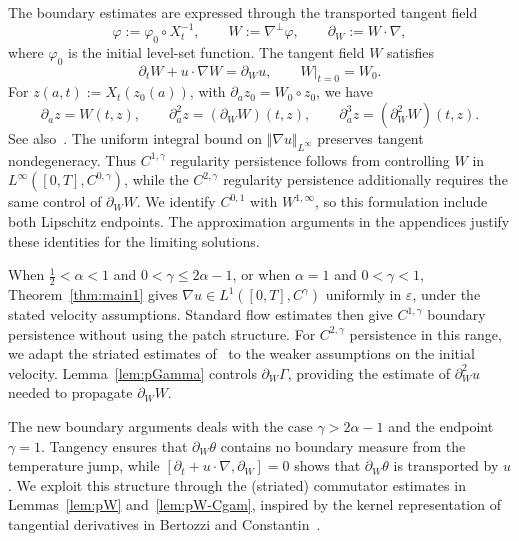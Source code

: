 \documentclass[reqno,11pt,a4paper]{amsart}
\begin{document}
The boundary estimates are expressed through
the transported tangent field
\[
  \varphi:=\varphi_0\circ X_t^{-1},
  \qquad W:=\nabla^\perp\varphi,
  \qquad \partial_W:=W\cdot\nabla,
\]
where $\varphi_0$ is the initial level-set function.
The tangent field $W$ satisfies
\begin{equation}\label{eq:W-eq}
  \partial_tW+u\cdot\nabla W=\partial_Wu,
  \qquad W|_{t=0}=W_0.
\end{equation}
For $z(a,t):=X_t(z_0(a))$, with
$\partial_a z_0=W_0\circ z_0$, we have
\begin{equation}\label{eq:boundary-identities}
  \partial_a z=W(t,z),\qquad
  \partial_a^2z=(\partial_WW)(t,z),\qquad
  \partial_a^3z=(\partial_W^2W)(t,z).
\end{equation}
See also~\cite[Equations~(4.2)-(4.6)]{CMX22}.
The uniform integral bound on $\Vert \nabla u\Vert _{L^\infty}$
preserves tangent nondegeneracy.
Thus $C^{1,\gamma}$ regularity persistence follows from controlling
$W$ in $L^\infty([0,T],C^{0,\gamma})$,
while the $C^{2,\gamma}$ regularity persistence additionally requires
the same control of $\partial_WW$.
We identify $C^{0,1}$ with $W^{1,\infty}$,
so this formulation include both Lipschitz endpoints.
The approximation arguments in the appendices
justify these identities for the limiting solutions.






When $\frac12<\alpha<1$ and $0<\gamma\leq2\alpha-1$,
or when $\alpha=1$ and $0<\gamma<1$,
Theorem~\ref{thm:main1} gives
$\nabla u\in L^1([0,T],C^\gamma)$
uniformly in $\varepsilon$,
under the stated velocity assumptions.
Standard flow estimates then give
$C^{1,\gamma}$ boundary persistence
without using the patch structure. For $C^{2,\gamma}$ persistence in this range,
we adapt the striated estimates of~\cite{LXY25}
to the weaker assumptions on the initial velocity.
Lemma~\ref{lem:pGamma} controls $\partial_W\Gamma$,
providing the estimate of $\partial_W^2u$
needed to propagate $\partial_WW$.

The new boundary arguments deals with the case
$\gamma>2\alpha-1$ and the endpoint $\gamma=1$.
Tangency ensures that $\partial_W\theta$
contains no boundary measure from the temperature jump,
while
$[\partial_t+u\cdot\nabla,\partial_W]=0$
shows that $\partial_W\theta$ is transported by $u$.
We exploit this structure through the (striated) commutator
estimates in Lemmas~\ref{lem:pW}
and~\ref{lem:pW-Cgam}, inspired by the kernel
representation of tangential derivatives
in Bertozzi and Constantin~\cite{BerC}.
\end{document}
